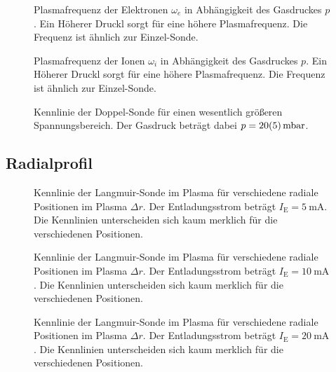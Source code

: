\begin{figure}[htbp]
    \centering
    
    \caption{
        Plasmafrequenz der Elektronen $\omega_e$ in Abh\"angigkeit des Gasdruckes $p$.
        Ein H\"oherer Druckl sorgt f\"ur eine h\"ohere Plasmafrequenz.
        Die Frequenz ist \"ahnlich zur Einzel-Sonde.
    }
    \label{double_wpe}
\end{figure}

\begin{figure}[htbp]
    \centering
    
    \caption{
        Plasmafrequenz der Ionen $\omega_i$ in Abh\"angigkeit des Gasdruckes $p$.
        Ein H\"oherer Druckl sorgt f\"ur eine h\"ohere Plasmafrequenz.
        Die Frequenz ist \"ahnlich zur Einzel-Sonde.
    }
    \label{double_wpi}
\end{figure}

\begin{figure}[htbp]
    \centering
    
    \caption{
        Kennlinie der Doppel-Sonde f\"ur einen wesentlich gr\"o\ss eren Spannungsbereich.
        Der Gasdruck betr\"agt dabei $p=\SI{20\pm 5}{\milli\bar}$.
    }
    \label{double_KL_1}
\end{figure}

\FloatBarrier
\subsection{Radialprofil}\label{radial}
\begin{figure}[htbp]
    \centering
    
    \caption{
        Kennlinie der Langmuir-Sonde im Plasma f\"ur verschiedene radiale Positionen im Plasma $\Delta r$.
        Der Entladungsstrom betr\"agt $I_\text{E}=\SI{5}{\milli\ampere}$.
        Die Kennlinien unterscheiden sich kaum merklich f\"ur die verschiedenen Positionen.
    }
    \label{radial_KL_I5}
\end{figure}
\begin{figure}[htbp]
    \centering
    
    \caption{
        Kennlinie der Langmuir-Sonde im Plasma f\"ur verschiedene radiale Positionen im Plasma $\Delta r$.
        Der Entladungsstrom betr\"agt $I_\text{E}=\SI{10}{\milli\ampere}$.
        Die Kennlinien unterscheiden sich kaum merklich f\"ur die verschiedenen Positionen.
    }
    \label{radial_KL_I10}
\end{figure}
\begin{figure}[htbp]
    \centering
    
    \caption{
        Kennlinie der Langmuir-Sonde im Plasma f\"ur verschiedene radiale Positionen im Plasma $\Delta r$.
        Der Entladungsstrom betr\"agt $I_\text{E}=\SI{20}{\milli\ampere}$.
        Die Kennlinien unterscheiden sich kaum merklich f\"ur die verschiedenen Positionen.
    }
    \label{radial_KL_I20}
\end{figure}

